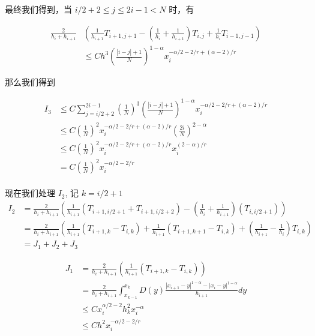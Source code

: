 \documentclass{ctexart}
\theoremstyle{definition}
\theoremstyle{remark}
\numberwithin{equation}{section}
\begin{document}
最终我们得到，当 \(i/2+2\le j \le 2i-1 < N\) 时，有

\begin{equation}
    \begin{aligned}
        \frac{2}{h_i + h_{i+1}} & \left( \frac{1}{h_{i+1}} T_{i+1, j+1} - (\frac{1}{h_{i}}+\frac{1}{h_{i+1}}) T_{i,j}+  \frac{1}{h_{i}} T_{i-1, j-1} \right) \\
                                & \le C h^3 \left(\frac{|i-j|+1}{N}\right)^{1-\alpha} x_i^{-\alpha/2-2/r+(\alpha-2)/r}
    \end{aligned}
\end{equation}

那么我们得到

\begin{equation}
    \begin{aligned}
        I_3 & \le C \sum_{j=i/2+2}^{2i-1} \left(\frac{1}{N}\right)^3 \left(\frac{|i-j|+1}{N}\right)^{1-\alpha} x_i^{-\alpha/2-2/r+(\alpha-2)/r} \\
            & \le C  \left(\frac{1}{N}\right)^2 x_i^{-\alpha/2-2/r+(\alpha-2)/r} \left(\frac{2i}{N}\right)^{2-\alpha}                           \\
            & \le C \left(\frac{1}{N}\right)^2 x_i^{-\alpha/2-2/r+(\alpha-2)/r} x_i^{(2-\alpha)/r}                                              \\
            & = C \left(\frac{1}{N}\right)^2 x_i^{-\alpha/2-2/r}
    \end{aligned}
\end{equation}
\\


现在我们处理 \(I_2\), 记 \(k = i/2+1\)
\begin{equation}
    \begin{aligned}
        I_2 & = \frac{2}{h_i + h_{i+1}}
        \left( \frac{1}{h_{i+1}} (T_{i+1, i/2+1} +  T_{i+1, i/2+2})
        - (\frac{1}{h_{i}}+\frac{1}{h_{i+1}}) (T_{i,i/2+1}) \right)                                          \\
            & = \frac{2}{h_i + h_{i+1}}
        \left( \frac{1}{h_{i+1}} (T_{i+1, k} -  T_{i, k})
        + \frac{1}{h_{i+1}} (T_{i+1, k+1} - T_{i,k}) + (\frac{1}{h_{i+1}} - \frac{1}{h_{i}}) T_{i,k} \right) \\
            & = J_1 + J_2 + J_3
    \end{aligned}
\end{equation}


\begin{equation}
    \begin{aligned}
        J_1 & = \frac{2}{h_i + h_{i+1}} \left( \frac{1}{h_{i+1}} (T_{i+1, k} -  T_{i, k}) \right)                                \\
            & = \frac{2}{h_i + h_{i+1}} \int_{x_{k-1}}^{x_k} D(y) \frac{|x_{i+1}-y|^{1-\alpha} - |x_i-y|^{1-\alpha}}{h_{i+1}} dy \\
            & \le C x_i^{\alpha/2-2} h_k^2 x_i^{-\alpha}                                                                         \\
            & \le C h^2 x_i^{-\alpha/2-2/r}
    \end{aligned}
\end{equation}
\end{document}
